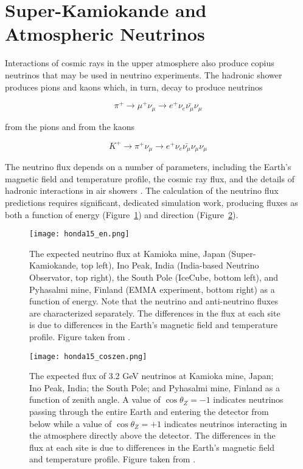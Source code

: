 \section{Super-Kamiokande and Atmospheric Neutrinos}
Interactions of cosmic rays in the upper atmosphere also produce copius neutrinos that may be used in neutrino experiments.
The hadronic shower produces pions and kaons which, in turn, decay to produce neutrinos 

\begin{equation}
\pi^+ \rightarrow \mu^+ \nu_\mu \rightarrow e^+ \nu_e \bar{\nu_\mu} \nu_\mu
\end{equation}

from the pions and from the kaons

\begin{equation}
K^+ \rightarrow \pi^+ \nu_\mu \rightarrow  e^+ \nu_e \bar{\nu_\mu} \nu_\mu \nu_\mu
\end{equation}

The neutrino flux depends on a number of parameters, including the Earth's magnetic field and temperature profile, the cosmic ray flux, and the details of hadronic interactions in air showers \cite{Honda-2015}.
The calculation of the neutrino flux predictions requires significant, dedicated simulation work, producing fluxes as both a function of energy (Figure~\ref{fig:honda_en}) and direction (Figure~\ref{fig:honda_coszen}).

\begin{figure}[!h]
\texttt{[image: honda15\_en.png]}
\caption{The expected neutrino flux at Kamioka mine, Japan (Super-Kamiokande, top left), Ino Peak, India (India-based Neutrino Observator, top right), the South Pole (IceCube, bottom left), and Pyhasalmi mine, Finland (EMMA experiment, bottom right) as a function of energy. Note that the neutrino and anti-neutrino fluxes are characterized separately. The differences in the flux at each site is due to differences in the Earth's magnetic field and temperature profile. Figure taken from \cite{Honda-2015}.}
\label{fig:honda_en}
\end{figure}

\begin{figure}[!h]
\texttt{[image: honda15\_coszen.png]}
\caption{The expected flux of 3.2 GeV neutrinos at Kamioka mine, Japan; Ino Peak, India; the South Pole; and Pyhasalmi mine, Finland as a function of zenith angle. A value of $\cos \theta_Z=-1$ indicates neutrinos passing through the entire Earth and entering the detector from below while a value of $\cos \theta_Z=+1$ indicates neutrinos interacting in the atmosphere directly above the detector. The differences in the flux at each site is due to differences in the Earth's magnetic field and temperature profile. Figure taken from \cite{Honda-2015}.}
\label{fig:honda_coszen}
\end{figure}

